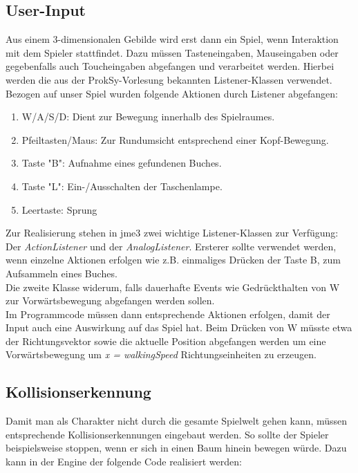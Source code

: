 \subsection{User-Input}

Aus einem 3-dimensionalen Gebilde wird erst dann ein Spiel, wenn Interaktion mit dem Spieler stattfindet. Dazu müssen Tasteneingaben, Mauseingaben oder gegebenfalls auch Toucheingaben abgefangen und verarbeitet werden.
Hierbei werden die aus der ProkSy-Vorlesung bekannten Listener-Klassen verwendet.
Bezogen auf unser Spiel wurden folgende Aktionen durch Listener abgefangen:
\begin{enumerate}
	\item W/A/S/D: Dient zur Bewegung innerhalb des Spielraumes.
	\item Pfeiltasten/Maus: Zur Rundumsicht entsprechend einer Kopf-Bewegung.
	\item Taste "B": Aufnahme eines gefundenen Buches.
	\item Taste "L": Ein-/Ausschalten der Taschenlampe.
	\item Leertaste: Sprung
\end{enumerate} Zur Realisierung stehen in jme3 zwei wichtige Listener-Klassen zur Verfügung: Der \emph{ActionListener} und der \emph{AnalogListener}.
Ersterer sollte verwendet werden, wenn einzelne Aktionen erfolgen wie z.B. einmaliges Drücken der Taste B, zum Aufsammeln eines Buches.\\
Die zweite Klasse widerum, falls dauerhafte Events wie Gedrückthalten von W zur Vorwärtsbewegung abgefangen werden sollen. \\
Im Programmcode müssen dann entsprechende Aktionen erfolgen, damit der Input auch eine Auswirkung auf das Spiel hat. Beim Drücken von W müsste etwa der Richtungsvektor sowie die aktuelle Position abgefangen werden um eine Vorwärtsbewegung um \emph{x = walkingSpeed} Richtungseinheiten zu erzeugen.

\subsection{Kollisionserkennung}
Damit man als Charakter nicht durch die gesamte Spielwelt gehen kann, müssen entsprechende Kollisionserkennungen eingebaut werden. So sollte der Spieler beispielsweise stoppen, wenn er sich in einen Baum hinein bewegen würde. Dazu kann in der Engine der folgende Code realisiert werden:


